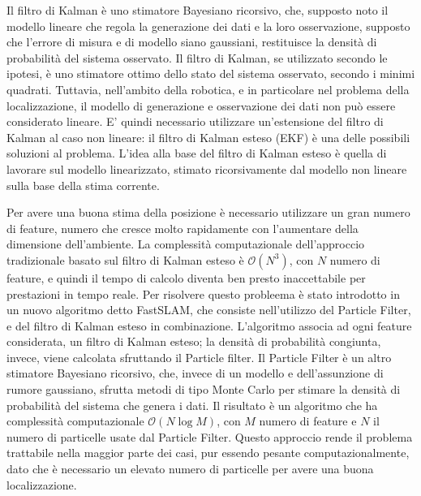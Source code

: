 Il filtro di Kalman è uno stimatore Bayesiano ricorsivo, che, supposto noto il modello lineare che regola la generazione dei dati e la loro osservazione, supposto che l'errore di misura e di modello siano gaussiani, restituisce la densità di probabilità del sistema osservato. 
Il filtro di Kalman, se utilizzato secondo le ipotesi, è uno stimatore ottimo dello stato del sistema osservato, secondo i minimi quadrati.
Tuttavia, nell'ambito della robotica, e in particolare nel problema della localizzazione, il modello di generazione e osservazione dei dati non può essere considerato lineare.
E' quindi necessario utilizzare un'estensione del filtro di Kalman al caso non lineare: il filtro di Kalman esteso (EKF) è una delle possibili soluzioni al problema. 
L'idea alla base del filtro di Kalman esteso è quella di lavorare sul modello linearizzato, stimato ricorsivamente dal modello non lineare sulla base della stima corrente.

Per avere una buona stima della posizione è necessario utilizzare un gran numero di feature, numero che cresce molto rapidamente con l'aumentare della dimensione dell'ambiente.
La complessità computazionale dell'approccio tradizionale basato sul filtro di Kalman esteso è $\mathcal{O}(N^3)$, con $N$ numero di feature, e quindi il tempo di calcolo diventa ben presto inaccettabile per prestazioni in tempo reale.
Per risolvere questo probleema è stato introdotto in~\cite{Montemerlo02a} un nuovo algoritmo detto FastSLAM, che consiste nell'utilizzo del Particle Filter, e del filtro di Kalman esteso in combinazione. L'algoritmo associa ad ogni feature considerata, un filtro di Kalman esteso; la densità di probabilità congiunta, invece, viene calcolata sfruttando il Particle filter. 
Il Particle Filter è un altro stimatore Bayesiano ricorsivo, che, invece di un modello e dell'assunzione di rumore gaussiano, sfrutta metodi di tipo Monte Carlo per stimare la densità di probabilità del sistema che genera i dati.
Il risultato è un algoritmo che ha complessità computazionale $\mathcal{O}(N\log M)$, con $M$ numero di feature e $N$ il numero di particelle usate dal Particle Filter. 
Questo approccio rende il problema trattabile nella maggior parte dei casi, pur essendo pesante computazionalmente, dato che \`e necessario un elevato numero di particelle per avere una buona localizzazione.

